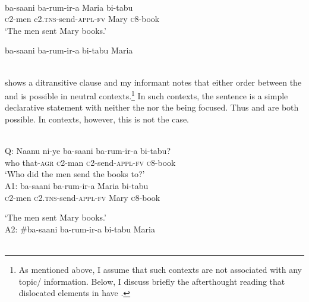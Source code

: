 \documentclass[output=paper,newtxmath,modfonts,nonflat,hidelinks]{langsci/langscibook}
\begin{document}
\ea\label{ex:selvanathan:5}
\\
\ea\label{ex:selvanathan:5a}
{\gll ba-saani   ba-rum-ir-a        Maria   bi-tabu    \\
	\textsc{c}2-men   c2.\textsc{tns}{}-send-\textsc{appl}{}-\textsc{fv}   Mary   \textsc{c}8-book \\}
\glt `The men sent Mary books.'

\ex\label{ex:selvanathan:5b}
	{\gll ba-saani   ba-rum-ir-a    bi-tabu   Maria      \\
	\\}
\z
\z

\newpage 
{} shows a ditransitive clause and my informant notes that either order between the  and  is possible in neutral contexts.\footnote{As mentioned above, I assume that such contexts are not associated with any topic\slash {} information. Below, I discuss briefly the afterthought reading that dislocated elements in  have \citep{Diercks2013}.}  In such contexts, the sentence is a simple declarative statement with neither the  nor the  being focused. Thus  and  are both possible. In  contexts, however, this is not the case.

\ea\label{ex:selvanathan:6}
 \\
Q: 
\gll Naanu      ni-ye            ba-saani    ba-rum-ir-a     bi-tabu?\\
who       that-\textsc{agr}   \textsc{c}2-man      \textsc{c}2-send-\textsc{appl}{}-\textsc{fv}  \textsc{c}8-book\\
\glt \-\hspace{0.5cm}`Who did the men send the books to?' \\

A1: 
{\gll ba-saani    ba-rum-ir-a            Maria  bi-tabu        \\
	\textsc{c}2-men     \textsc{c}2.\textsc{tns}{}-send-\textsc{appl}{}-\textsc{fv}   Mary   \textsc{c}8-book \\}

\glt \-\hspace{0.5cm}`The men sent Mary books.'\\

A2: 
{\gll \#ba-saani  ba-rum-ir-a            bi-tabu   Maria         \\
\\}
\z
\end{document}
